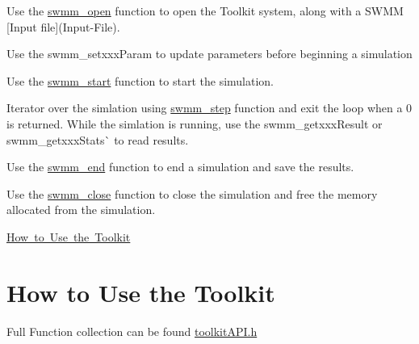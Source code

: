 \begin{DoxyEnumerate}
\item Use the \mbox{\hyperlink{swmm5_8h_a2da4baa38e451ef2a978f1366898948e}{swmm\+\_\+open}} function to open the Toolkit system, along with a S\+W\+MM \mbox{[}Input file\mbox{]}(Input-\/\+File).
\item Use the {\ttfamily swmm\+\_\+setxxx\+Param} to update parameters before beginning a simulation
\item Use the \mbox{\hyperlink{swmm5_8h_a06eb7b28597a24f892edfc303e12b2d7}{swmm\+\_\+start}} function to start the simulation.
\item Iterator over the simlation using \mbox{\hyperlink{swmm5_8h_a20624449e77d94d71c0e61d7f58558b5}{swmm\+\_\+step}} function and exit the loop when a 0 is returned. While the simlation is running, use the {\ttfamily swmm\+\_\+getxxx\+Result} or swmm\+\_\+getxxx\+Stats\`{} to read results.
\item Use the \mbox{\hyperlink{swmm5_8h_a8e69e10ab4948522041deb92fc4b43c0}{swmm\+\_\+end}} function to end a simulation and save the results.
\item Use the \mbox{\hyperlink{swmm5_8h_a76dac918844d9551a1b39432284b70ef}{swmm\+\_\+close}} function to close the simulation and free the memory allocated from the simulation.
\end{DoxyEnumerate}
\begin{DoxyItemize}
\item \mbox{\hyperlink{how-to-use}{How to Use the Toolkit}} 
\end{DoxyItemize}\hypertarget{how-to-use}{}\section{How to Use the Toolkit}\label{how-to-use}
Full Function collection can be found \mbox{\hyperlink{toolkit_a_p_i_8h}{toolkit\+A\+P\+I.\+h}}


